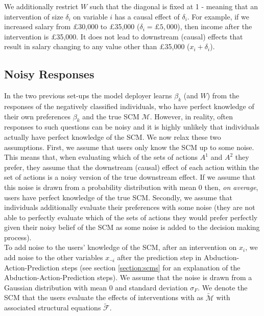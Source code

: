 We additionally restrict $W$ such that the diagonal is fixed at 1 - meaning that an intervention of size $\delta_i$ on variable $i$ has a causal effect of $\delta_i$. For example, if we increased salary from £30,000 to £35,000 ($\delta_i=£5,000$), then income after the intervention is £35,000. It does not lead to downstream (causal) effects that result in salary changing to any value other than £35,000 ($x_i + \delta_i$).

\subsection{Noisy Responses} \label{section:noisy_responses}

In the two previous set-ups the model deployer learns $\beta_k$ (and $W$) from the responses of the negatively classified individuals, who have perfect knowledge of their own preferences $\beta_k$ and the true SCM $\mathcal{M}$. However, in reality, often responses to such questions can be noisy and it is highly unlikely that individuals actually have perfect knowledge of the SCM. We now relax these two assumptions. First, we assume that users only know the SCM up to some noise. This means that, when evaluating which of the sets of actions $A^1$ and $A^2$ they prefer, they assume that the downstream (causal) effect of each action within the set of actions is a noisy version of the true downstream effect. If we assume that this noise is drawn from a probability distribution with mean 0 then, \textit{on average}, users have perfect knowledge of the true SCM. Secondly, we assume that individuals additionally evaluate their preferences with some noise (they are not able to perfectly evaluate which of the sets of actions they would prefer perfectly given their noisy belief of the SCM as some noise is added to the decision making process).\\

To add noise to the users' knowledge of the SCM, after an intervention on $x_i$, we add noise to the other variables $x_{\neg i}$ after the prediction step in Abduction-Action-Prediction steps \citep{pearl2016causal} (see section \ref{section:scms} for an explanation of the Abduction-Action-Prediction steps). We assume that the noise is drawn from a Gaussian distribution with mean 0 and standard deviation $\sigma_F$. We denote the SCM that the users evaluate the effects of interventions with as $\tilde{\mathcal{M}}$ with associated structural equations $\tilde{\mathcal{F}}$.\\

